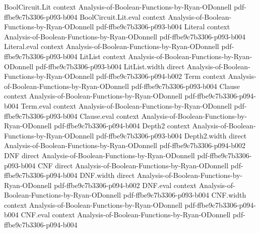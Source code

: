 \begin{lemma}
\label{DecisionTree.coeffs_eq_zero_of_depth_lt}
\leanok
{}
\proofstep
  {BoolCircuit.Lit}
  {context}
  {Analysis-of-Boolean-Functions-by-Ryan-ODonnell}
  {pdf-ffbe9c7b3306-p093-b004}
\proofstep
  {BoolCircuit.Lit.eval}
  {context}
  {Analysis-of-Boolean-Functions-by-Ryan-ODonnell}
  {pdf-ffbe9c7b3306-p093-b004}
\proofstep
  {Literal}
  {context}
  {Analysis-of-Boolean-Functions-by-Ryan-ODonnell}
  {pdf-ffbe9c7b3306-p093-b004}
\proofstep
  {Literal.eval}
  {context}
  {Analysis-of-Boolean-Functions-by-Ryan-ODonnell}
  {pdf-ffbe9c7b3306-p093-b004}
\proofstep
  {LitList}
  {context}
  {Analysis-of-Boolean-Functions-by-Ryan-ODonnell}
  {pdf-ffbe9c7b3306-p093-b004}
\proofstep
  {LitList.width}
  {direct}
  {Analysis-of-Boolean-Functions-by-Ryan-ODonnell}
  {pdf-ffbe9c7b3306-p094-b002}
\proofstep
  {Term}
  {context}
  {Analysis-of-Boolean-Functions-by-Ryan-ODonnell}
  {pdf-ffbe9c7b3306-p093-b004}
\proofstep
  {Clause}
  {context}
  {Analysis-of-Boolean-Functions-by-Ryan-ODonnell}
  {pdf-ffbe9c7b3306-p094-b004}
\proofstep
  {Term.eval}
  {context}
  {Analysis-of-Boolean-Functions-by-Ryan-ODonnell}
  {pdf-ffbe9c7b3306-p093-b004}
\proofstep
  {Clause.eval}
  {context}
  {Analysis-of-Boolean-Functions-by-Ryan-ODonnell}
  {pdf-ffbe9c7b3306-p094-b004}
\proofstep
  {Depth2}
  {context}
  {Analysis-of-Boolean-Functions-by-Ryan-ODonnell}
  {pdf-ffbe9c7b3306-p093-b004}
\proofstep
  {Depth2.width}
  {direct}
  {Analysis-of-Boolean-Functions-by-Ryan-ODonnell}
  {pdf-ffbe9c7b3306-p094-b002}
\proofstep
  {DNF}
  {direct}
  {Analysis-of-Boolean-Functions-by-Ryan-ODonnell}
  {pdf-ffbe9c7b3306-p093-b004}
\proofstep
  {CNF}
  {direct}
  {Analysis-of-Boolean-Functions-by-Ryan-ODonnell}
  {pdf-ffbe9c7b3306-p094-b004}
\proofstep
  {DNF.width}
  {direct}
  {Analysis-of-Boolean-Functions-by-Ryan-ODonnell}
  {pdf-ffbe9c7b3306-p094-b002}
\proofstep
  {DNF.eval}
  {context}
  {Analysis-of-Boolean-Functions-by-Ryan-ODonnell}
  {pdf-ffbe9c7b3306-p093-b004}
\proofstep
  {CNF.width}
  {context}
  {Analysis-of-Boolean-Functions-by-Ryan-ODonnell}
  {pdf-ffbe9c7b3306-p094-b004}
\proofstep
  {CNF.eval}
  {context}
  {Analysis-of-Boolean-Functions-by-Ryan-ODonnell}
  {pdf-ffbe9c7b3306-p094-b004}

\end{lemma}
